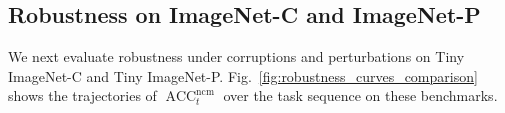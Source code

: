 \documentclass{article}
\theoremstyle{plain}
\theoremstyle{definition}
\theoremstyle{remark}
\begin{document}











\subsection{Robustness on ImageNet-C and ImageNet-P}
\label{sec:results-robustness}

We next evaluate robustness under corruptions and perturbations on Tiny ImageNet-C and Tiny ImageNet-P. Fig.~\ref{fig:robustness_curves_comparison} shows the trajectories of $\operatorname{ACC}_t^{\mathrm{ncm}}$ over the task sequence on these benchmarks. 

\end{document}
